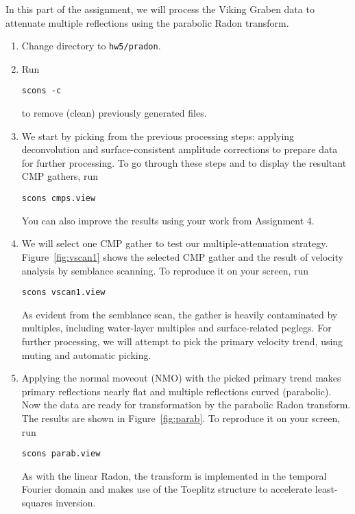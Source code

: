 In this part of the assignment, we will process the Viking Graben data
to attenuate multiple reflections using the parabolic Radon transform.

\begin{enumerate}

\item Change directory to \texttt{hw5/pradon}.
\item Run
\begin{verbatim}
scons -c
\end{verbatim}
to remove (clean) previously generated files.
\item We start by picking from the previous processing steps: applying deconvolution and surface-consistent amplitude corrections to prepare data for further processing. To go through these steps and to display the resultant CMP gathers, run
\begin{verbatim}
scons cmps.view
\end{verbatim}
You can also improve the results using your work from Assignment 4.


\item We will select one CMP gather to test our multiple-attenuation strategy. Figure~\ref{fig:vscan1} shows the selected CMP gather and the result of velocity analysis by semblance scanning. To reproduce it on your screen, run
\begin{verbatim}
scons vscan1.view
\end{verbatim}
As evident from the semblance scan, the gather is heavily contaminated
by multiples, including water-layer multiples and surface-related
peglegs. For further processing, we will attempt to pick the primary
velocity trend, using muting and automatic picking.


\item Applying the normal moveout (NMO) with the picked primary trend makes primary reflections nearly flat and multiple reflections curved (parabolic). Now the data are ready for transformation by the parabolic Radon transform. The results are shown in Figure~\ref{fig:parab}. To reproduce it on your screen, run
\begin{verbatim}
scons parab.view
\end{verbatim}
As with the linear Radon, the transform is implemented in the temporal
Fourier domain and makes use of the Toeplitz structure to accelerate
least-squares inversion.


\end{enumerate}
